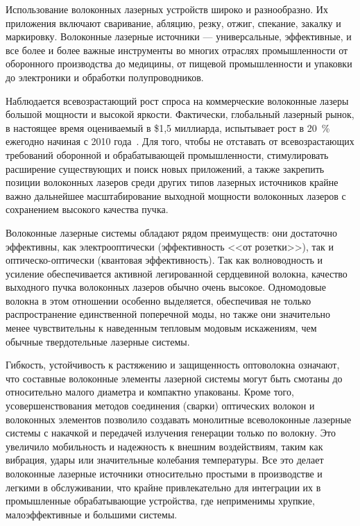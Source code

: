 Использование волоконных лазерных устройств широко и разнообразно. Их приложения включают сваривание, абляцию, резку, отжиг, спекание, закалку и маркировку. Волоконные лазерные источники --- универсальные, эффективные, и все более и более важные инструменты во многих отраслях промышленности от оборонного производства до медицины, от пищевой промышленности и упаковки до электроники и обработки полупроводников.

Наблюдается всевозрастающий рост спроса на коммерческие волоконные лазеры большой мощности и высокой яркости. Фактически, глобальный лазерный рынок, в настоящее время оцениваемый в \$1,5 миллиарда, испытывает рост в 20~\% ежегодно начиная с 2010 года~\cite{into_las_16}.  Для того, чтобы не отставать от всевозрастающих требований оборонной и обрабатывающей промышленности, стимулировать расширение существующих и поиск новых приложений, а также закрепить позиции волоконных лазеров среди других типов лазерных источников крайне важно дальнейшее масштабирование выходной мощности волоконных лазеров с сохранением высокого качества пучка.

Волоконные лазерные системы обладают рядом преимуществ: они достаточно эффективны, как электрооптически (эффективность <<от розетки>>), так и оптическо-оптически (квантовая эффективность). Так как волноводность и усиление обеспечивается активной легированной сердцевиной волокна, качество выходного пучка волоконных лазеров обычно очень высокое. Одномодовые волокна в этом отношении особенно выделяется, обеспечивая не только распространение единственной поперечной моды, но также они значительно менее чувствительны к наведенным тепловым модовым искажениям, чем обычные твердотельные лазерные системы.

Гибкость, устойчивость к растяжению и защищенность оптоволокна означают, что составные волоконные элементы лазерной системы могут быть смотаны до относительно малого диаметра и компактно упакованы. Кроме того, усовершенствования методов соединения (сварки) оптических волокон и волоконных элементов позволило создавать монолитные всеволоконные лазерные системы с накачкой и передачей излучения генерации только по волокну. Это увеличило мобильность и надежность к внешним воздействиям, таким как вибрация, удары или значительные колебания температуры. Все это делает волоконные лазерные источники относительно простыми в производстве и легкими в обслуживании, что крайне привлекательно для интеграции их в промышленные обрабатывающие устройства, где неприменимы хрупкие, малоэффективные и большими системы.


